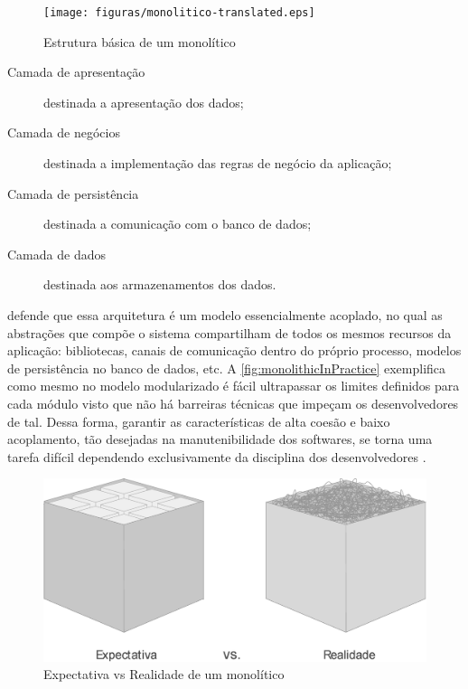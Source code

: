 \begin{figure}[h]
  \centering
  \texttt{[image: figuras/monolitico-translated.eps]}
  \caption{Estrutura básica de um monolítico\label{fig:monolithicStructure} }
\end{figure}

\begin{description}
    \item [Camada de apresentação] destinada a apresentação dos dados;
    \item [Camada de negócios] destinada a implementação das regras de negócio da aplicação;
    \item [Camada de persistência] destinada a comunicação com o banco de dados;
    \item [Camada de dados] destinada aos armazenamentos dos dados.
\end{description}

 defende que essa arquitetura é um modelo
essencialmente acoplado, no qual as abstrações que compõe o sistema compartilham de todos os mesmos
recursos da aplicação: bibliotecas, canais de comunicação dentro do próprio processo, modelos de
persistência no banco de dados, etc. A \autoref{fig:monolithicInPractice} exemplifica como mesmo no
modelo modularizado é fácil ultrapassar os limites definidos para cada módulo visto que não há barreiras
técnicas que impeçam os desenvolvedores de tal. Dessa forma, garantir as características de alta coesão
e baixo acoplamento, tão desejadas na manutenibilidade dos softwares, se torna uma tarefa difícil dependendo
exclusivamente da disciplina dos desenvolvedores \cite{StefanTilkov:DontStartWithAMonolith,MartinFowler:MicroserviceTradeOffs}.

\begin{figure}[h]
  \centering
  \includegraphics[keepaspectratio=true,scale=0.4]{figuras/monolith-theory-practice-translated.eps}
  \caption{Expectativa vs Realidade de um monolítico\label{fig:monolithicInPractice} }
\end{figure}

